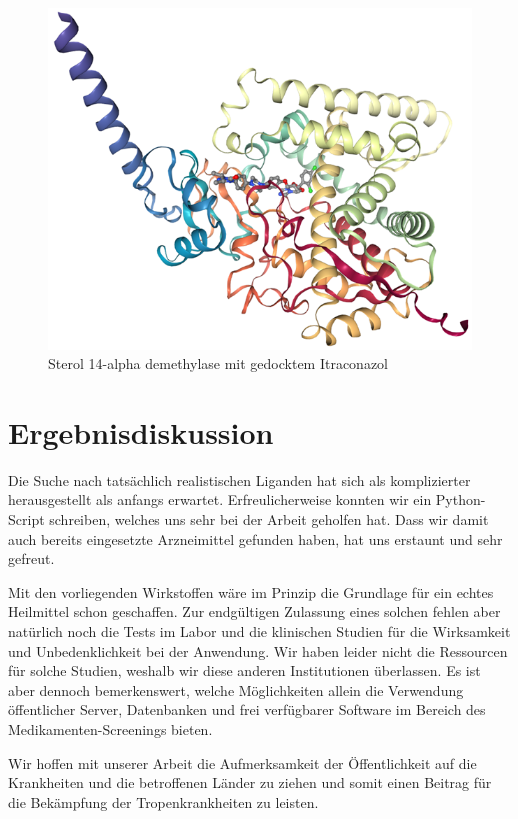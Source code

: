 \documentclass[10pt]{article}
\begin{document}
    \begin{figure}[H]
        \centering
        \includegraphics[width=0.6\linewidth]{Sterol 14-alpha demethylase mit gedocktem Itraconazol}
        \caption{Sterol 14-alpha demethylase mit gedocktem Itraconazol}\label{fig:figure-sterol-Itraconazol}
    \end{figure}


    \section{Ergebnisdiskussion}\label{sec:ergebnisdiskussion}
    Die Suche nach tatsächlich realistischen Liganden hat sich als komplizierter herausgestellt als anfangs erwartet.
    Erfreulicherweise konnten wir ein Python-Script schreiben, welches uns sehr bei der Arbeit geholfen hat. Dass wir
    damit auch bereits eingesetzte Arzneimittel gefunden haben, hat uns erstaunt und sehr gefreut.

    Mit den vorliegenden Wirkstoffen wäre im Prinzip die Grundlage für ein echtes Heilmittel schon geschaffen. Zur
    endgültigen Zulassung eines solchen fehlen aber natürlich noch die Tests im Labor und die klinischen Studien für
    die Wirksamkeit und Unbedenklichkeit bei der Anwendung.
    Wir haben leider nicht die Ressourcen für solche Studien,
    weshalb wir diese anderen Institutionen überlassen.
    Es ist aber dennoch bemerkenswert, welche Möglichkeiten
    allein die Verwendung öffentlicher Server, Datenbanken und frei verfügbarer Software im Bereich des
    Medikamenten-Screenings bieten.

    Wir hoffen mit unserer Arbeit die Aufmerksamkeit der Öffentlichkeit auf die Krankheiten und die betroffenen
    Länder zu ziehen und somit einen Beitrag für die Bekämpfung der Tropenkrankheiten zu leisten.
\end{document}
